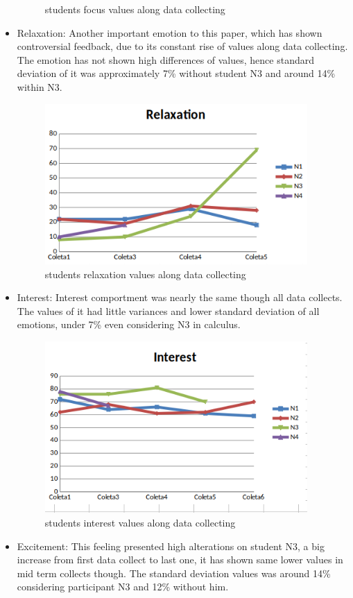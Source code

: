 \documentclass[12pt,openright,a4paper]{article}
\begin{document}
\begin{itemize}
\begin{figure}[H]
 	  	\caption{students focus values along data collecting}
 	  \end{figure}
 	\item Relaxation: Another important emotion to this paper, which has shown controversial feedback, due to its constant rise of values along data collecting. The emotion has not shown high differences of values, hence standard deviation of it was approximately 7\% without student N3 and around 14\% within N3. 
 	  \begin{figure}[H]
 	 	\centering
 	 	\includegraphics[width=10cm]{./relaxation.png}
 	 	\caption{students relaxation values along data collecting}
 	 \end{figure}
 	\item Interest: Interest comportment  was nearly the same though all data collects. The values of it had little variances and lower standard deviation of all emotions, under 7\% even considering N3 in calculus. 
 	     \begin{figure}[H]
 	    	\centering
 	    	\includegraphics[width=10cm]{./interest.png}
 	    	\caption{students interest values along data collecting}
 	    \end{figure}
 	\item Excitement: This feeling presented high alterations on student N3, a big increase from first data collect to last one, it has shown same lower values in mid term collects though. The standard deviation values was around 14\% considering participant N3 and 12\% without him.

\end{itemize}
\end{document}
